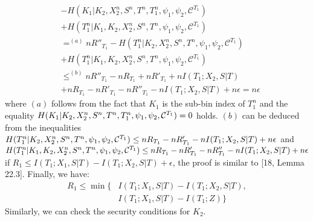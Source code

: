 \documentclass[conference,8pt]{IEEEtran}
\begin{document}
{{{{{{\begin{align}
&-H(K_1|K_2,X^n_2,S^n,T^n,T^n_1,\psi_1,\psi_2,\mathcal{C}^{T_1})\nonumber \\
&+H(T^n_1|K_1,K_2,X^n_2,S^n,T^n,\psi_1 , \psi_2,\mathcal{C}^{T_1}) \nonumber \\
&=^{(a)} nR''_{T_1}- H(T^n_1|K_2,X^n_2,S^n,T^n,\psi_1,\psi_2,\mathcal{C}^{T_1})\nonumber \\
&+H(T^n_1|K_1,K_2,X^n_2,S^n,T^n,\psi_1 , \psi_2,\mathcal{C}^{T_1})\nonumber \\
&\leq^{(b)} nR''_{T_1}-nR_{T_1}+nR'_{T_1}+nI(T_1;X_2,S|T)\nonumber \\
&+nR_{T_1}-nR'_{T_1}-nR''_{T_1}-nI(T_1;X_2,S|T)+n\epsilon= n\epsilon
\end{align}where $(a)$ follows from the fact that $K_1$ is the sub-bin index of $T^n_1$ and the equality $H(K_1|K_2,X^n_2,S^n,T^n,T^n_1,\psi_1,\psi_2,\mathcal{C}^{T_1}) \\ =0$ holds. $(b)$ can be deduced from the inequalities $H(T^n_1|K_2,X^n_2,S^n,T^n,\psi_1,\psi_2,\mathcal{C}^{T_1}) \leq nR_{T_1}-nR'_{T_1}-nI(T_1 \\ ;X_2,S|T)+n\epsilon$ and $H(T^n_1|K_1,K_2,X^n_2,S^n,T^n,\psi_1 , \psi_2,\mathcal{C}^{T_1}) \\ \leq nR_{T_1}-nR'_{T_1}-nR''_{T_1}-nI(T_1;X_2,S|T)+n\epsilon$ if $R_1 \leq I(T_1;X_1,S|T)- I(T_1;X_2,S|T)+\epsilon$, the proof is similar to [18, Lemma 22.3]. Finally, we have:
\begin{align}
R_1 \leq \min \{&I(T_1;X_1,S|T)- I(T_1;X_2,S|T), \nonumber \\
&I(T_1;X_1,S|T)-I(T_1;Z) \} \nonumber
\end{align}
Similarly, we can check the security conditions for $K_2$.






}
}}}}}
\end{document}
